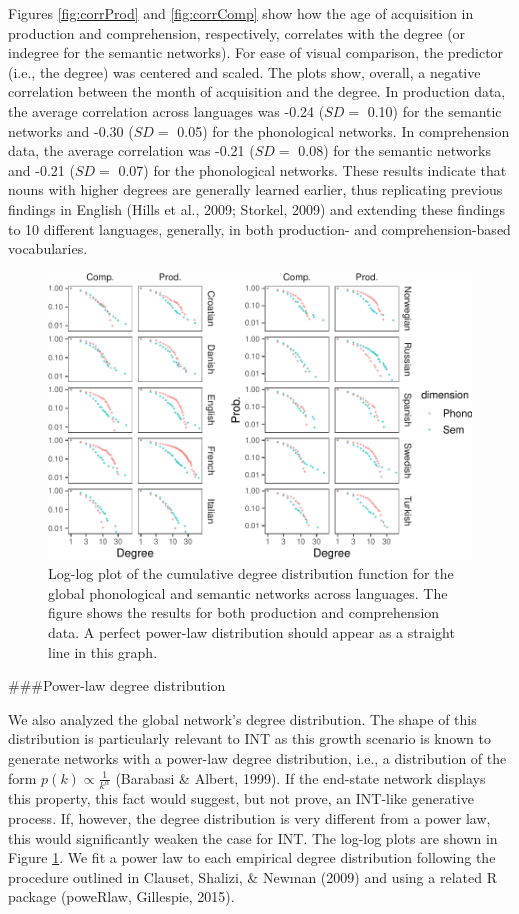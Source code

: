 \documentclass[english,,man,floatsintext]{apa6}
\begin{document}
Figures \ref{fig:corrProd} and \ref{fig:corrComp} show how the age of acquisition in production and comprehension, respectively, correlates with the degree (or indegree for the semantic networks). For ease of visual comparison, the predictor (i.e., the degree) was centered and scaled. The plots show, overall, a negative correlation between the month of acquisition and the degree. In production data, the average correlation across languages was -0.24 (\(SD=\) 0.10) for the semantic networks and -0.30 (\(SD=\) 0.05) for the phonological networks. In comprehension data, the average correlation was -0.21 (\(SD=\) 0.08) for the semantic networks and -0.21 (\(SD=\) 0.07) for the phonological networks. These results indicate that nouns with higher degrees are generally learned earlier, thus replicating previous findings in English (Hills et al., 2009; Storkel, 2009) and extending these findings to 10 different languages, generally, in both production- and comprehension-based vocabularies.

\begin{figure}[!h]
\includegraphics[width=\textwidth]{ms_files/figure-latex/degreeDist-1} \caption{Log-log plot of the cumulative degree distribution function for the global phonological and semantic networks across languages. The figure shows the results for both production and comprehension data. A perfect power-law distribution should appear as a straight line in this graph.}\label{fig:degreeDist}
\end{figure}

\#\#\#Power-law degree distribution

We also analyzed the global network's degree distribution. The shape of this distribution is particularly relevant to INT as this growth scenario is known to generate networks with a power-law degree distribution, i.e., a distribution of the form \(p(k) \propto \frac{1}{k^{\alpha}}\) (Barabasi \& Albert, 1999). If the end-state network displays this property, this fact would suggest, but not prove, an INT-like generative process. If, however, the degree distribution is very different from a power law, this would significantly weaken the case for INT. The log-log plots are shown in Figure \ref{fig:degreeDist}. We fit a power law to each empirical degree distribution following the procedure outlined in Clauset, Shalizi, \& Newman (2009) and using a related R package (poweRlaw, Gillespie, 2015).
\end{document}
